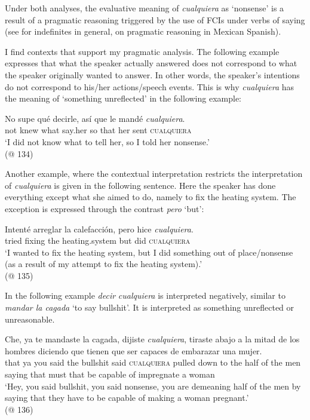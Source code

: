 Under both analyses, the evaluative meaning of \textit{cualquiera} as ‘nonsense’ is a result of a pragmatic reasoning triggered by the use of FCIs under verbs of saying (see \citealt{Aloni2007} for indefinites in general, \citealt{Kellert2020semantic} on pragmatic reasoning in Mexican Spanish).

I find contexts that support my pragmatic analysis. The following example expresses that what the speaker actually answered does not correspond to what the speaker originally wanted to answer. In other words, the speaker’s intentions do not correspond to his/her actions/speech events. This is why \textit{cualquiera} has the meaning of ‘something unreflected’ in the following example:

\ea \label{ex:key:234} %
\gll No supe qué decirle, así que le mandé \textit{cualquiera}.\\
    not knew what say.her so that her sent \textsc{cualquiera}\\
    \glt ‘I did not know what to tell her, so I told her nonsense.’\\
    (@ 134)
\z

Another example, where the contextual interpretation restricts the interpretation of \textit{cualquiera} is given in the following sentence. Here the speaker has done everything except what she aimed to do, namely to fix the heating system. The exception is expressed through the contrast \textit{pero} ‘but’:

\ea \label{ex:key:235} %
    \gll Intenté  arreglar  la  calefacción,  pero  hice  \textit{cualquiera}.\\
    tried  fixing  the  heating.system  but  did  \textsc{cualquiera}\\
    \glt ‘I wanted to fix the heating system, but I did something out of place/nonsense (as a result of my attempt to fix the heating system).’\\
    (@ 135)
\z

In the following example \textit{decir} \textit{cualquiera} is interpreted negatively, similar to \textit{mandar la cagada} ‘to say bullshit’. It is interpreted as something unreflected or unreasonable.

\ea \label{ex:key:236} %
    \gll Che, ya te mandaste la cagada, dijiste \textit{cualquiera}, tiraste abajo a la mitad de los hombres diciendo que tienen que ser capaces de embarazar una mujer.\\
    that ya you said the bullshit said \textsc{cualquiera} pulled down to the half of the men saying that must that be capable of impregnate a woman\\
    \glt ‘Hey, you said bullshit, you said nonsense, you are demeaning half of the men by saying that they have to be capable of making a woman pregnant.’\\
    (@ 136)
\z

